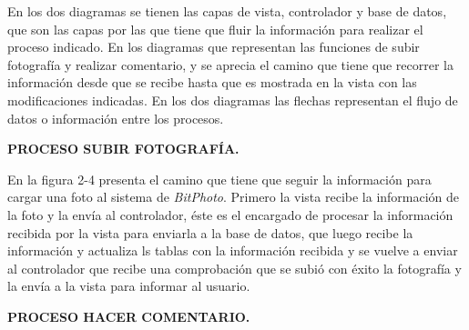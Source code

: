 \documentclass{memoria}
\begin{document}
En los dos diagramas se tienen las capas de vista, controlador y base de datos, que son las capas por las que tiene que fluir la información para realizar el proceso indicado. En los diagramas que representan las funciones de subir fotografía y realizar comentario, y se aprecia el camino que tiene que recorrer la información desde que se recibe hasta que es mostrada en la vista con las modificaciones indicadas. En los dos diagramas las flechas representan el flujo de datos o información entre los procesos.

\textbf{PROCESO SUBIR FOTOGRAFÍA.}


En la figura 2-4 presenta el camino que tiene que seguir la información para cargar una foto al sistema de \textsl{BitPhoto}. Primero la vista recibe la información de la foto y la envía al controlador, éste es el encargado de procesar la información recibida por la vista para enviarla a la base de datos, que luego recibe la información y actualiza ls tablas con la información recibida y se vuelve a enviar al controlador que recibe una comprobación que se subió con éxito la fotografía y la envía a la vista para informar al usuario.

\newpage
\textbf{PROCESO HACER COMENTARIO.}
\end{document}
